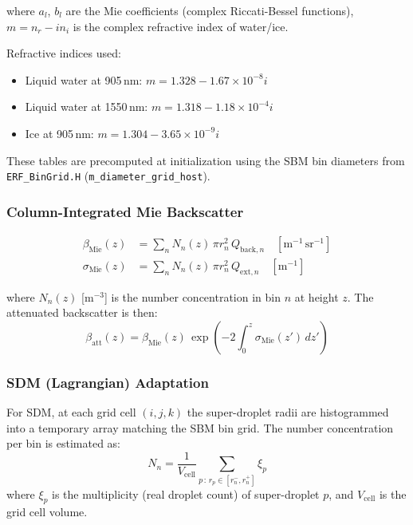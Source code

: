 \documentclass[11pt,letterpaper]{article}
\begin{document}
\noindent where $a_l$, $b_l$ are the Mie coefficients (complex Riccati-Bessel functions),
$m = n_r - i n_i$ is the complex refractive index of water/ice.

Refractive indices used:
\begin{itemize}
  \item Liquid water at 905\,nm: $m = 1.328 - 1.67\times10^{-8}i$
  \item Liquid water at 1550\,nm: $m = 1.318 - 1.18\times10^{-4}i$
  \item Ice at 905\,nm: $m = 1.304 - 3.65\times10^{-9}i$
\end{itemize}

These tables are precomputed at initialization using the SBM bin diameters
from \texttt{ERF\_BinGrid.H} (\texttt{m\_diameter\_grid\_host}).

\subsubsection{Column-Integrated Mie Backscatter}

\begin{align}
  \beta_\mathrm{Mie}(z) &= \sum_n N_n(z)\,\pi r_n^2\,Q_{\mathrm{back},n}
  \quad [\mathrm{m}^{-1}\,\mathrm{sr}^{-1}]
  \label{eq:beta_Mie} \\[4pt]
  \sigma_\mathrm{Mie}(z) &= \sum_n N_n(z)\,\pi r_n^2\,Q_{\mathrm{ext},n}
  \quad [\mathrm{m}^{-1}]
  \label{eq:sigma_Mie}
\end{align}

\noindent where $N_n(z)$ [$\mathrm{m}^{-3}$] is the number concentration in bin $n$ at height $z$.
The attenuated backscatter is then:
\begin{equation}
  \beta_\mathrm{att}(z) = \beta_\mathrm{Mie}(z)\,\exp\!\left(-2\int_0^z \sigma_\mathrm{Mie}(z')\,dz'\right)
\end{equation}

\subsubsection{SDM (Lagrangian) Adaptation}

For SDM, at each grid cell $(i,j,k)$ the super-droplet radii are histogrammed into
a temporary array matching the SBM bin grid. The number concentration per bin is estimated as:
\begin{equation}
  N_n = \frac{1}{V_\mathrm{cell}}\sum_{p\,:\,r_p \in [r_n^-, r_n^+]} \xi_p
\end{equation}
where $\xi_p$ is the multiplicity (real droplet count) of super-droplet $p$,
and $V_\mathrm{cell}$ is the grid cell volume.
\end{document}
